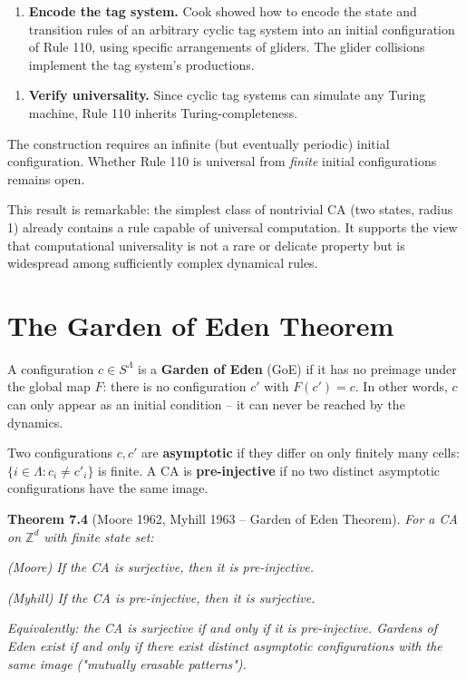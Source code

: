 \begin{enumerate}
\item \textbf{Encode the tag system.} Cook showed how to encode the state and transition rules of an arbitrary cyclic tag system into an initial configuration of Rule 110, using specific arrangements of gliders. The glider collisions implement the tag system's productions.
\end{enumerate}

\begin{enumerate}
\item \textbf{Verify universality.} Since cyclic tag systems can simulate any Turing machine, Rule 110 inherits Turing-completeness.
\end{enumerate}

The construction requires an infinite (but eventually periodic) initial configuration. Whether Rule 110 is universal from \textit{finite} initial configurations remains open.

This result is remarkable: the simplest class of nontrivial CA (two states, radius 1) already contains a rule capable of universal computation. It supports the view that computational universality is not a rare or delicate property but is widespread among sufficiently complex dynamical rules.


\section{The Garden of Eden Theorem}

A configuration $c \in S^{\Lambda}$ is a \textbf{Garden of Eden} (GoE) if it has no preimage under the global map $F$: there is no configuration $c'$ with $F(c') = c$. In other words, $c$ can only appear as an initial condition -- it can never be reached by the dynamics.

Two configurations $c, c'$ are \textbf{asymptotic} if they differ on only finitely many cells: $\{ i \in \Lambda : c_i \neq c'_i\} $ is finite. A CA is \textbf{pre-injective} if no two distinct asymptotic configurations have the same image.

\textbf{Theorem 7.4} (Moore 1962, Myhill 1963 -- Garden of Eden Theorem). \textit{For a CA on $\mathbb{Z}^d$ with finite state set:}

\textit{(Moore) If the CA is surjective, then it is pre-injective.}

\textit{(Myhill) If the CA is pre-injective, then it is surjective.}

\textit{Equivalently: the CA is surjective if and only if it is pre-injective. Gardens of Eden exist if and only if there exist distinct asymptotic configurations with the same image ("mutually erasable patterns").}

